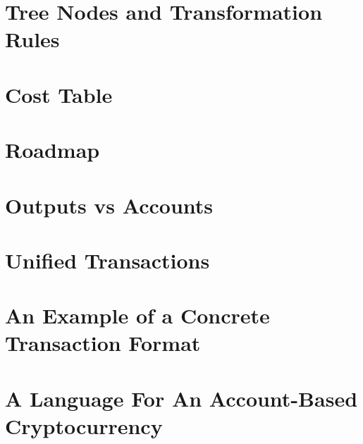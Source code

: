 \documentclass[]{llncs}
\newcommand{\authnote}[2]{\marginpar{\parbox{\marginparwidth}{\tiny %
  \textsf{#1 {\textcolor{blue}{notes: #2}}}}}%
  \textcolor{blue}{\textbf{\dag}}}
\newcommand{\authnote}[2]{
  \textsf{#1 \textcolor{blue}{: #2}}}
\newcommand{\authnote}[2]{}
\newcommand{\knote}[1]{{\authnote{\textcolor{green}{kushti notes}}{#1}}}
\begin{document}
\section{Tree Nodes and Transformation Rules}

\section{Cost Table}

\section{Roadmap}

\section{Outputs vs Accounts}

\section{Unified Transactions}
\label{apx:unified}

\section{An Example of a Concrete Transaction Format}
\label{apx:tx-format}

\knote{Describe Ergo transaction format here. Malleability problems to be discussed here.}

\section{A Language For An Account-Based Cryptocurrency}
\label{apx:account}
\end{document}

